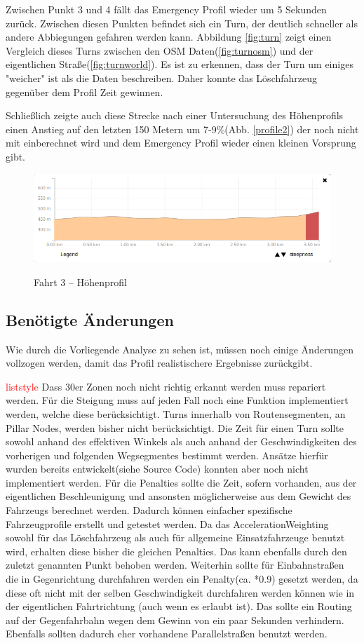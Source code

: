 \documentclass[12pt,a4paper]{article}
\newcommand\todo[1]{\textcolor{red}{#1}}
\begin{document}
Zwischen Punkt 3 und 4 fällt das Emergency Profil wieder um 5 Sekunden zurück. Zwischen diesen Punkten befindet sich ein Turn, der deutlich schneller als andere Abbiegungen gefahren werden kann. Abbildung \ref{fig:turn} zeigt einen Vergleich dieses Turns zwischen den OSM Daten(\ref{fig:turnosm}) und der eigentlichen Straße(\ref{fig:turnworld}). Es ist zu erkennen, dass der Turn um einiges "weicher" ist als die Daten beschreiben. Daher konnte das Löschfahrzeug gegenüber dem Profil Zeit gewinnen.

Schließlich zeigte auch diese Strecke nach einer Untersuchung des Höhenprofils einen Anstieg auf den letzten 150 Metern um 7-9\%(Abb. \ref{profile2}) der noch nicht mit einberechnet wird und dem Emergency Profil wieder einen kleinen Vorsprung gibt.

\begin{figure}[h]
\centering
\caption{Fahrt 3 -- Höhenprofil}
\label{fig:profile2}
\includegraphics[width = 0.60 \textwidth]{../media/Fahrt3_Profile.png} \\
\end{figure}


\subsection{Benötigte Änderungen}

Wie durch die Vorliegende Analyse zu sehen ist, müssen noch einige Änderungen vollzogen werden, damit das Profil realistischere Ergebnisse zurückgibt.\par
\todo{liststyle}
Dass 30er Zonen noch nicht richtig erkannt werden muss repariert werden.
Für die Steigung muss auf jeden Fall noch eine Funktion implementiert werden, welche diese berücksichtigt.
Turns innerhalb von Routensegmenten, an Pillar Nodes, werden bisher nicht berücksichtigt.
Die Zeit für einen Turn sollte sowohl anhand des effektiven Winkels als auch anhand der Geschwindigkeiten des vorherigen und folgenden Wegsegmentes bestimmt werden. Ansätze hierfür wurden bereits entwickelt(siehe Source Code) konnten aber noch nicht implementiert werden.
Für die Penalties sollte die Zeit, sofern vorhanden, aus der eigentlichen Beschleunigung und ansonsten möglicherweise aus dem Gewicht des Fahrzeugs berechnet werden. Dadurch können einfacher spezifische Fahrzeugprofile erstellt und getestet werden.
Da das AccelerationWeighting sowohl für das Löschfahrzeug als auch für allgemeine Einsatzfahrzeuge benutzt wird, erhalten diese bisher die gleichen Penalties. Das kann ebenfalls durch den zuletzt genannten Punkt behoben werden.
Weiterhin sollte für Einbahnstraßen die in Gegenrichtung durchfahren werden ein Penalty(ca. *0.9) gesetzt werden, da diese oft nicht mit der selben Geschwindigkeit durchfahren werden können wie in der eigentlichen Fahrtrichtung (auch wenn es erlaubt ist). Das sollte ein Routing auf der Gegenfahrbahn wegen dem Gewinn von ein paar Sekunden verhindern. Ebenfalls sollten dadurch eher vorhandene Parallelstraßen benutzt werden.
\end{document}
